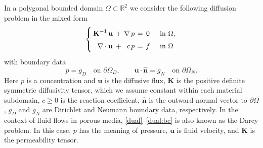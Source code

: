 \documentclass[12pt]{article}
\newcommand{\vect}[1]{\boldsymbol{\mathbf{#1}}}
\newcommand{\Rn}[1]{{\mathbb R^{#1}}}
\begin{document}
In a polygonal bounded domain $\Omega \subset \Rn{2}$  we consider the following diffusion problem in the mixed form
\begin{equation}\label{dual}
	\arraycolsep=2pt\def\arraystretch{1.5}
	\left\{\begin{array}{rcrccl}
		\vect K^{-1}\,\vect u & + & \nabla\,p & = & 0 &\quad\text{in } \Omega , \\
		\nabla\cdot\vect u    & + & c\,p      & = & f &\quad\text{in } \Omega
		\end{array}\right.
\end{equation}
with boundary data
\begin{equation}
	p = g_D \quad\text{on } \partial\Omega_D,\qquad %
	\vect u \cdot \hat{\vect n} = g_N \quad\text{on } \partial\Omega_N. \label{dual:bc}
\end{equation}
Here $p$ is a concentration and $\vect u$ is the diffusive flux, $\vect K$ is the positive definite  symmetric diffusivity tensor, which we assume constant within each material subdomain, $c\ge0$ is the reaction coefficient, $\hat{\vect n}$ is the outward normal vector to $\partial\Omega$, $g_D$ and $g_N$ are Dirichlet and Neumann boundary data, respectively. In the context of fluid flows in porous media, \eqref{dual}--\eqref{dual:bc} is also known as the Darcy problem. In this case, $p$ has the meaning of pressure, $\vect u$ is fluid velocity, and $\vect K$ is the permeability tensor.
\end{document}
